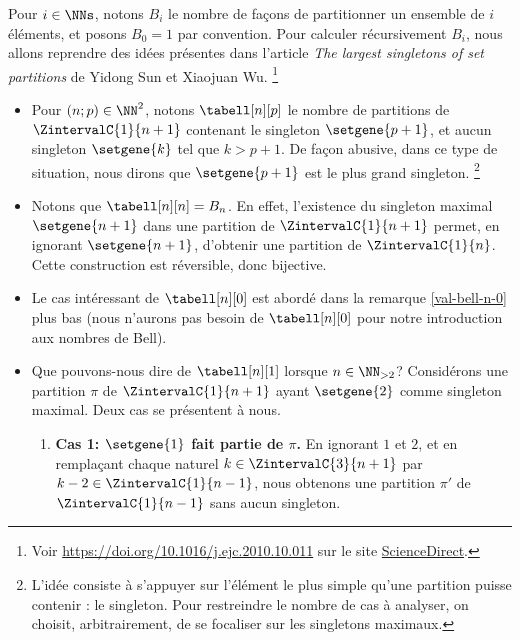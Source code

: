 Pour $i \in \NNs$, notons $B_i$ le nombre de façons de partitionner un ensemble de $i$ éléments, et posons $B_0 = 1$ par convention.
Pour calculer récursivement $B_i$, nous allons reprendre des idées présentes dans l'article
\emph{\og The largest singletons of set partitions \fg}
de Yidong Sun et Xiaojuan Wu.%
    \footnote{
    	Voir
	\url{https://doi.org/10.1016/j.ejc.2010.10.011}
	sur le site \href{https://www.sciencedirect.com/}{ScienceDirect}.
}
%
\begin{itemize}
    \item Pour $(n ; p) \in \NN^2$, notons $\tabell[n][p]$ le nombre de partitions de $\ZintervalC{1}{n+1}$ contenant le singleton $\setgene{p+1}$, et aucun singleton $\setgene{k}$ tel que $k > p+1$.
    De façon abusive, dans ce type de situation, nous dirons que $\setgene{p+1}$ est le plus grand singleton.%
    \footnote{
        L’idée consiste à s’appuyer sur l’élément le plus simple qu’une partition puisse contenir : le singleton.
        Pour restreindre le nombre de cas à analyser, on choisit, arbitrairement, de se focaliser sur les singletons maximaux.
    }


    \item Notons que $\tabell[n][n] = B_n$.
    En effet,
    l'existence du singleton maximal $\setgene{n+1}$ dans une partition de $\ZintervalC{1}{n+1}$ permet, en ignorant $\setgene{n+1}$, d'obtenir une partition de $\ZintervalC{1}{n}$.
    Cette construction est réversible, donc bijective.


    \item Le cas intéressant de $\tabell[n][0]$ est abordé dans la remarque \ref{val-bell-n-0} plus bas (nous n'aurons pas besoin de $\tabell[n][0]$ pour notre introduction aux nombres de Bell).


    \item Que pouvons-nous dire de $\tabell[n][1]$ lorsque $n \in \NN_{>2}$?
    Considérons une partition $\pi$ de $\ZintervalC{1}{n+1}$ ayant $\setgene{2}$ comme singleton maximal.
    Deux cas se présentent à nous.
    \begin{enumerate}
    	\item \textbf{\boldmath Cas 1: $\setgene{1}$ fait partie de $\pi$.}
        En ignorant $1$ et $2$,
        et
        en remplaçant chaque naturel $k \in \ZintervalC{3}{n+1}$ par $k-2 \in \ZintervalC{1}{n-1}$,
        nous obtenons une partition $\pi'$ de $\ZintervalC{1}{n-1}$ sans aucun singleton.



\end{enumerate}
\end{itemize}
